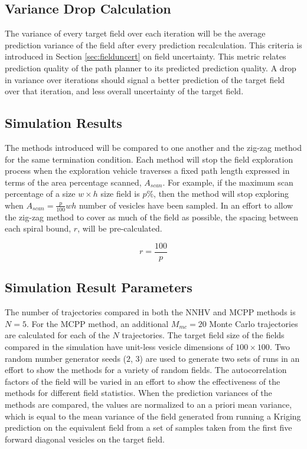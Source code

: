 \subsection{Variance Drop Calculation}
The variance of every target field over each iteration will be the average prediction variance of the field after every prediction recalculation. This criteria is introduced in Section \ref{sec:fielduncert} on field uncertainty. This metric relates prediction quality of the path planner to its predicted prediction quality. A drop in variance over iterations should signal a better prediction of the target field over that iteration, and less overall uncertainty of the target field.

\subsection{Simulation Results}
The methods introduced will be compared to one another and the zig-zag method for the same termination condition. Each method will stop the field exploration process when the exploration vehicle traverses a fixed path length expressed in terms of the area percentage scanned, $A_{scan}$. For example, if the maximum scan percentage of a size $w \times h$ size field is $p\%$, then the method will stop exploring when $A_{scan} = \frac{p}{100}wh$ number of vesicles have been sampled. In an effort to allow the zig-zag method to cover as much of the field as possible, the spacing between each spiral bound, $r$, will be pre-calculated.

\begin{equation}
    r = \frac{100}{p}
\end{equation}

\subsection{Simulation Result Parameters}
The number of trajectories compared in both the NNHV and MCPP methods is $N=5$. For the MCPP method, an additional $M_{mc}=20$ Monte Carlo trajectories are calculated for each of the $N$ trajectories. The target field size of the fields compared in the simulation have unit-less vesicle dimensions of $100\times 100$. Two random number generator seeds ($2$, $3$) are used to generate two sets of runs in an effort to show the methods for a variety of random fields. The autocorrelation factors of the field will be varied in an effort to show the effectiveness of the methods for different field statistics. When the prediction variances of the methods are compared, the values are normalized to an a priori mean variance, which is equal to the mean variance of the field generated from running a Kriging prediction on the equivalent field from a set of samples taken from the first five forward diagonal vesicles on the target field.

